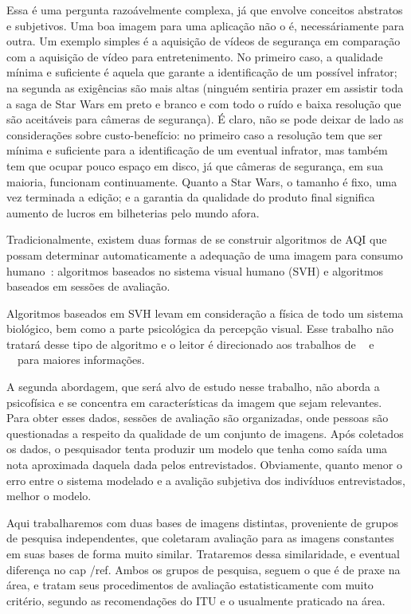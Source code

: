 	Essa é uma pergunta razoávelmente complexa, já que envolve conceitos abstratos e subjetivos. Uma boa imagem para uma aplicação não o é, necessáriamente para outra. Um exemplo simples é a aquisição de vídeos de segurança em comparação com a aquisição de vídeo para entretenimento. No primeiro caso, a qualidade mínima e suficiente é aquela que garante a identificação de um possível infrator; na segunda as exigências são mais altas (ninguém sentiria prazer em assistir toda a saga de Star Wars em preto e branco e com todo o ruído e baixa resolução que são aceitáveis para câmeras de segurança). É claro, não se pode deixar de lado as considerações sobre custo-benefício: no primeiro caso a resolução tem que ser mínima e suficiente para a identificação de um eventual infrator, mas também tem que ocupar pouco espaço em disco, já que câmeras de segurança, em sua maioria, funcionam continuamente. Quanto a Star Wars, o tamanho é fixo, uma vez terminada a edição; e a garantia da qualidade do produto final significa aumento de lucros em bilheterias pelo mundo afora.

	Tradicionalmente, existem duas formas de se construir algoritmos de AQI que possam determinar automaticamente a adequação de uma imagem para consumo humano~\cite{Chandler2013}: algoritmos baseados no sistema visual humano (SVH) e algoritmos baseados em sessões de avaliação.

	Algoritmos baseados em SVH levam em consideração a física de todo um sistema biológico, bem como a parte psicológica da percepção visual. Esse trabalho não tratará desse tipo de algoritmo e o leitor é direcionado aos trabalhos de ~\cite{Takemura2002} e ~\cite{Winkler-2005-Wiley}\ para maiores informações. 
	
	A segunda abordagem, que será alvo de estudo nesse trabalho, não aborda a psicofísica e se concentra em características da imagem que sejam relevantes. Para obter esses dados, sessões de avaliação são organizadas, onde pessoas são questionadas a respeito da qualidade de um conjunto de imagens. Após coletados os dados, o pesquisador tenta produzir um modelo que tenha como saída uma nota aproximada daquela dada pelos entrevistados. Obviamente, quanto menor o erro entre o sistema modelado e a avalição subjetiva dos indivíduos entrevistados, melhor o modelo.

	Aqui trabalharemos com duas bases de imagens distintas, proveniente de grupos de pesquisa independentes, que coletaram avaliação para as imagens constantes em suas bases de forma muito similar. Trataremos dessa similaridade, e eventual diferença no cap /ref{}. Ambos os grupos de pesquisa, seguem o que é de praxe na área, e tratam seus procedimentos de avaliação estatisticamente com muito critério, segundo as recomendações do ITU e o usualmente praticado na área.

